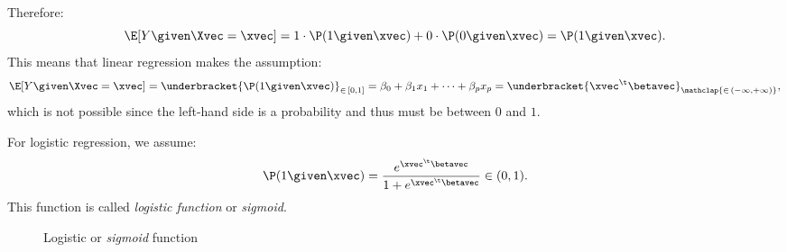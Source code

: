 \begin{examples}
\begin{enumerate}
\begin{equation}
              \end{equation}
              Therefore:
              \begin{equation}
                  \E[Y \given \Xvec = \xvec] = 1 \cdot \P(1 \given \xvec) + 0 \cdot \P(0 \given \xvec) = \P(1 \given \xvec).
              \end{equation}
              This means that linear regression makes the assumption:
              \begin{equation}
                  \E[Y \given \Xvec = \xvec] = \underbracket{\P(1 \given \xvec)}_{\in\,[0,1]} = \beta_0 + \beta_1 x_1 + \cdots + \beta_p x_p = \underbracket{\xvec^\t \betavec}_{\mathclap{\in\,(-\infty, +\infty)}},
              \end{equation}
              which is not possible since the left-hand side is a probability and thus must be between $0$ and $1$.\qedhere
    \end{enumerate}
\end{examples}

For logistic regression, we assume:
\begin{equation}
    \P(1 \given \xvec) = \frac{e^{\xvec^\t\betavec}}{1 + e^{\xvec^\t \betavec}} \in (0,1).
\end{equation}
This function is called \emph{logistic function} or \emph{sigmoid}.

\begin{figure}[tb]
    \centering
    \caption{Logistic or \emph{sigmoid} function}
\end{figure}

